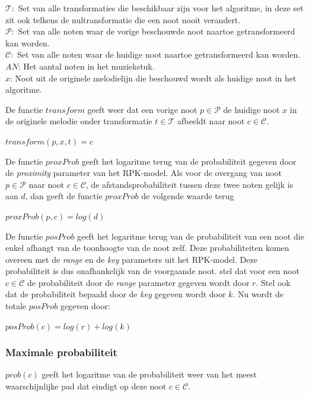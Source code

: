 \begin{framed}
\noindent
$\mathcal{T}:$ Set van alle transformaties die beschikbaar zijn voor het algoritme, in deze set zit ook telkens de nultransformatie die een noot nooit verandert.\\
$\mathcal{P}:$ Set van alle noten waar de vorige beschouwde noot naartoe getransformeerd kan worden.\\
$\mathcal{C}:$ Set van alle noten waar de huidige noot naartoe getransformeerd kan worden.\\
$AN$: Het aantal noten in het muziekstuk.\\
$x$: Noot uit de originele melodielijn die beschouwd wordt als huidige noot in het algoritme.
\end{framed}

De functie $transform$ geeft weer dat een vorige noot $p\in \mathcal{P}$ de huidige noot $x$ in de originele melodie onder transformatie $t\in \mathcal{T}$ afbeeldt naar noot $c\in \mathcal{C}$.

\begin{framed}
\noindent
$transform(p,x,t)=c$
\end{framed}

De functie $proxProb$ geeft het logaritme terug van de probabiliteit gegeven door de \textit{proximity} parameter van het RPK-model. Als voor de overgang van noot $p\in \mathcal{P}$ naar noot $c\in \mathcal{C}$, de afstandsprobabiliteit tussen deze twee noten gelijk is aan $d$, dan geeft de functie $proxProb$ de volgende waarde terug

\begin{framed}
\noindent
$proxProb(p,c)=log(d)$
\end{framed}

De functie $posProb$ geeft het logaritme terug van de probabiliteit van een noot die enkel afhangt van de toonhoogte van de noot zelf. Deze probabiliteiten komen overeen met de \textit{range} en de \textit{key} parameters uit het RPK-model. Deze probabiliteit is dus onafhankelijk van de voorgaande noot. stel dat voor een noot $c\in \mathcal{C}$ de probabiliteit door de \textit{range} parameter gegeven wordt door $r$. Stel ook dat de probabiliteit bepaald door de \textit{key} gegeven wordt door $k$. Nu wordt de totale $posProb$ gegeven door:

\begin{framed}
\noindent
$posProb(c)=log(r) + log(k)$
\end{framed}

\subsubsection{Maximale probabiliteit}
$prob(c)$ geeft het logaritme van de probabiliteit weer van het meest waarschijnlijke pad dat eindigt op deze noot $c\in \mathcal{C}$.

